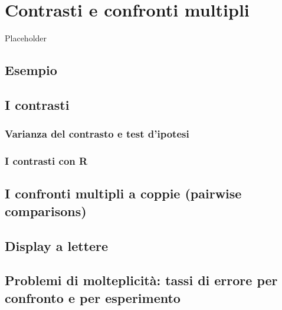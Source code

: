 \documentclass[a4paper,12pt,oneside]{book}
\begin{document}
\hypertarget{contrasti-e-confronti-multipli}{%
\chapter{Contrasti e confronti multipli}\label{contrasti-e-confronti-multipli}}

Placeholder

\hypertarget{esempio-1}{%
\section{Esempio}\label{esempio-1}}

\hypertarget{i-contrasti}{%
\section{I contrasti}\label{i-contrasti}}

\hypertarget{varianza-del-contrasto-e-test-dipotesi}{%
\subsection{Varianza del contrasto e test d'ipotesi}\label{varianza-del-contrasto-e-test-dipotesi}}

\hypertarget{i-contrasti-con-r}{%
\subsection{I contrasti con R}\label{i-contrasti-con-r}}

\hypertarget{i-confronti-multipli-a-coppie-pairwise-comparisons}{%
\section{I confronti multipli a coppie (pairwise comparisons)}\label{i-confronti-multipli-a-coppie-pairwise-comparisons}}

\hypertarget{display-a-lettere}{%
\section{Display a lettere}\label{display-a-lettere}}

\hypertarget{problemi-di-molteplicituxe0-tassi-di-errore-per-confronto-e-per-esperimento}{%
\section{Problemi di molteplicità: tassi di errore per confronto e per esperimento}\label{problemi-di-molteplicituxe0-tassi-di-errore-per-confronto-e-per-esperimento}}
\end{document}
